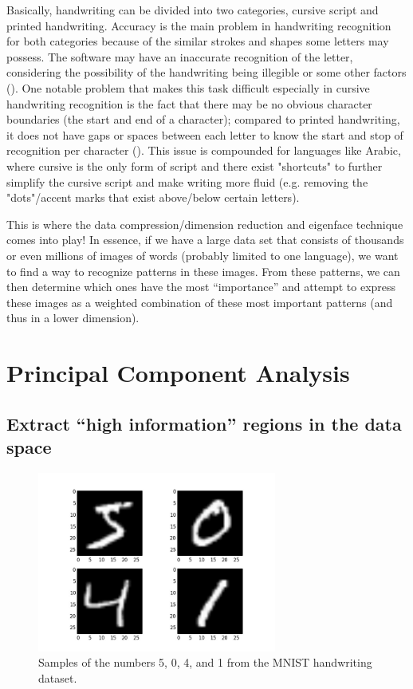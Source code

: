 \documentclass[12pt]{report}
\begin{document}
            Basically, handwriting can be divided into two categories, cursive script and printed handwriting. Accuracy is the main problem in handwriting recognition for both categories because of the similar strokes and shapes some letters may possess. The software may have an inaccurate recognition of the letter, considering the possibility of the handwriting being illegible or some other factors (). One notable problem that makes this task difficult especially in cursive handwriting recognition is the fact that there may be no obvious character boundaries (the start and end of a character); compared to printed handwriting, it does not have gaps or spaces between each letter to know the start and stop of recognition per character (). This issue is compounded for languages like Arabic, where cursive is the only form of script and there exist "shortcuts" to further simplify the cursive script and make writing more fluid (e.g. removing the "dots"/accent marks that exist above/below certain letters).
            
            This is where the data compression/dimension reduction and eigenface technique comes into play! In essence, if we have a large data set that consists of thousands or even millions of images of words (probably limited to one language), we want to find a way to recognize patterns in these images. From these patterns, we can then determine which ones have the most “importance” and attempt to express these images as a weighted combination of these most important patterns (and thus in a lower dimension).
        
    
    \chapter{Principal Component Analysis}
        \section{Extract ``high information'' regions in the data space}
            \begin{figure}[H]
                \centering
                \includegraphics[width=0.7\textwidth]{mnist-handwriting-dataset.jpg}
                \caption{\label{fig:mnist-handwriting-dataset} Samples of the numbers 5, 0, 4, and 1 from the MNIST handwriting dataset.}
            \end{figure}
\end{document}
